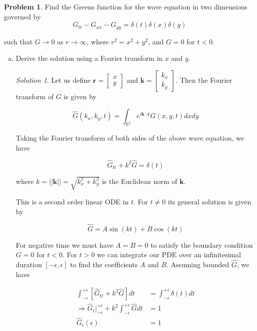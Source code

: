 \documentclass[12pt,a4paper]{article}
\theoremstyle{definition}
\newtheorem{problem}{Problem}
\theoremstyle{remark}
\newtheorem*{solution}{Solution}
\begin{document}
\begin{problem}
    Find the Greens function for the wave equation in two dimensions governed by $$G_{tt}-G_{xx}-G_{yy} = \delta(t)\delta(x)\delta(y)$$

    such that $G \rightarrow 0$ as $r \rightarrow \infty$, where $r^2 = x^2 + y^2$, and $G=0$ for $t<0$. 
\end{problem}
\begin{enumerate}[(a)]
    \item Derive the solution using a Fourier transform in $x$ and $y$.

    \begin{solution}
         Let us define $\mathbf r = \begin{bmatrix}
            x \\ y
         \end{bmatrix}$ and $\mathbf k = \begin{bmatrix}
            k_x \\ k_y
         \end{bmatrix}$. Then the Fourier transform of $G$ is given by 

         $$\hat G(k_x, k_y, t) = \int_{\mathbb R^2} e^{i\mathbf k \cdot \mathbf r} G(x, y, t) dx dy$$

         Taking the Fourier transform of both sides of the above wave equation, we have 

         $$\hat G_{tt} + k^2 \hat G = \delta(t)$$

         where $k=||\mathbf k|| = \sqrt{k_x^2 + k_y^2}$ is the Euclidean norm of $\mathbf k$. 

         This is a second order linear ODE in $t$. For $t \ne 0$ its general solution is given by 

         $$\hat G = A \sin(kt) + B \cos(kt)$$

         For negative time we must have $A=B=0$ to satisfy the boundary condition $G=0$ for $t<0$. For $t>0$ we can integrate our PDE over an infinitesimal duration $[-\epsilon, \epsilon]$ to find the coefficients $A$ and $B$. Assuming bounded $\hat G$, we have 

         \begin{align*}
            \int_{-\epsilon}^{+\epsilon} [\hat G_{tt} + k^2 \hat G] dt &= \int_{-\epsilon}^{+\epsilon} \delta(t)dt \\
            \Rightarrow \hat G_t \Big|_{-\epsilon}^{+\epsilon} + k^2 \int_{-\epsilon}^{+\epsilon} \hat G dt &= 1 \\
            \hat G_t(\epsilon) &= 1
         \end{align*}


\end{solution}
\end{enumerate}
\end{document}
